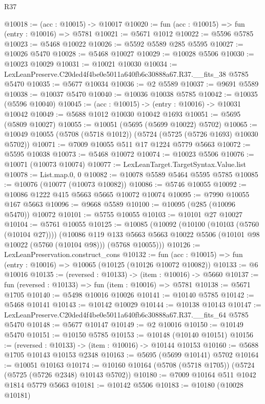 \begin{lexlean}{R37}
\begin{coremodule}
@10018 := (acc : @10015) -> @10017
@10020 := fun (acc : @10015) => fun (entry : @10016) => @5781
@10021 := @5671 @1012
@10022 := @5596 @5785
@10023 := @5468 @10022
@10026 := @5592 @5589 @285 @5595
@10027 := @10026 @5470
@10028 := @5468 @10027
@10029 := @10028 @5506
@10030 := @10023 @10029
@10031 := @10021 @10030
@10034 := LexLeanPreserve.C20ded4f4be0e5011a640fb6c30888a67.R37.__fits_38 @5785 @5470
@10035 := @5677 @10034
@10036 := @2 @5589
@10037 := @9691 @5589
@10038 := @10037 @5470
@10040 := @10036 @10038 @5785
@10042 := @10035 (@5596 @10040)
@10045 := (acc : @10015) -> (entry : @10016) -> @10031 @10042
@10049 := @5688 @1012 @10030 @10042 @1693
@10051 := @5695 (@5809 @10027)
@10055 := @10051 (@5695 (@5699 @10022) @5702)
@10065 := @10049 @10055 (@5708 (@5718 @1012)) (@5724 (@5725 (@5726 @1693) @10030 @5702))
@10071 := @7009 @10055 @511 @17 @1224 @5779 @5663
@10072 := @5595 @10038
@10073 := @5468 @10072
@10074 := @10023 @5506
@10076 := @10071 (@10073 @10074)
@10077 := LexLeanTarget.TargetSyntax.Value.list
@10078 := List.map.{0, 0}
@10082 := @10078 @5589 @5464 @5595 @5785
@10085 := @10076 (@10077 (@10073 @10082))
@10086 := @5746 @10055
@10092 := @10086 @1222 @415 @5663 @5665 @10072 @10074
@10095 := @7990 @10055 @167 @5663
@10096 := @9668 @5589
@10100 := @10095 (@285 (@10096 @5470)) @10072
@10101 := @5755 @10055
@10103 := @10101 @27 @10027
@10104 := @5761 @10055
@10125 := @10085
    (@10092
      (@10100 (@10103 (@5760 (@10104 @27))))
      (@10086
        @119
        @133
        @5663
        @5663
        @10022
        @5506
        (@10101 @98 @10022 (@5760 (@10104 @98)))
        (@5768 @10055)))
@10126 := LexLeanPreservation.construct_cons
@10132 := fun (acc : @10015) => fun (entry : @10016) => @10065 (@10125 (@10126 @10072 @10082))
@10133 := @6 @10016
@10135 := (reversed : @10133) -> (item : @10016) -> @5660
@10137 := fun (reversed : @10133) => fun (item : @10016) => @5781
@10138 := @5671 @1705
@10140 := @5498 @10016 @10026
@10141 := @10140 @5785
@10142 := @5468 @10141
@10143 := @10142 @10029
@10144 := @10138 @10143
@10147 := LexLeanPreserve.C20ded4f4be0e5011a640fb6c30888a67.R37.__fits_64 @5785 @5470
@10148 := @5677 @10147
@10149 := @2 @10016
@10150 := @10149 @5470
@10151 := @10150 @5785
@10153 := @10148 (@10140 @10151)
@10156 := (reversed : @10133) -> (item : @10016) -> @10144 @10153
@10160 := @5688 @1705 @10143 @10153 @2348
@10163 := @5695 (@5699 @10141) @5702
@10164 := @10051 @10163
@10174 := @10160 @10164 (@5708 (@5718 @1705)) (@5724 (@5725 (@5726 @2348) @10143 @5702))
@10180 := @7009 @10164 @511 @1042 @1814 @5779 @5663
@10181 := @10142 @5506
@10183 := @10180 (@10028 @10181)

\end{coremodule}
\end{lexlean}
